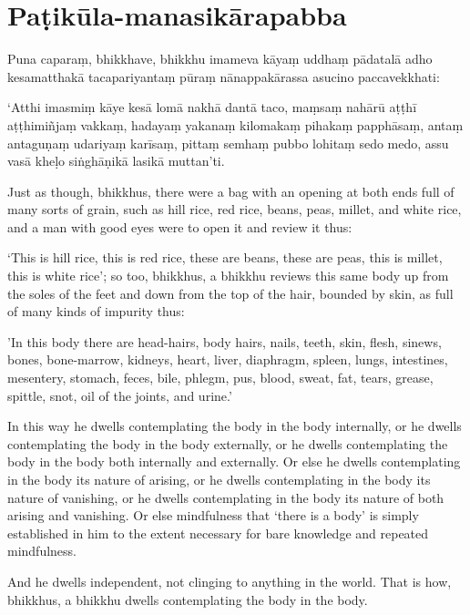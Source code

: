 
\section*{Paṭikūla-manasikārapabba}

Puna caparaṃ, bhikkhave, bhikkhu imameva kāyaṃ uddhaṃ pādatalā adho kesamatthakā
tacapariyantaṃ pūraṃ nānappakārassa asucino paccavekkhati:

‘Atthi imasmiṃ kāye kesā lomā nakhā dantā taco, maṃsaṃ nahārū aṭṭhī aṭṭhimiñjaṃ
vakkaṃ, hadayaṃ yakanaṃ kilomakaṃ pihakaṃ papphāsaṃ, antaṃ antaguṇaṃ udariyaṃ
karīsaṃ, pittaṃ semhaṃ pubbo lohitaṃ sedo medo, assu vasā kheḷo siṅghāṇikā
lasikā muttan’ti.

\englishPage

Just as though, bhikkhus, there were a bag with an opening at both ends full of
many sorts of grain, such as hill rice, red rice, beans, peas, millet, and white
rice, and a man with good eyes were to open it and review it thus:

‘This is hill rice, this is red rice, these are beans, these are peas, this is
millet, this is white rice’; so too, bhikkhus, a bhikkhu reviews this same body
up from the soles of the feet and down from the top of the hair, bounded by
skin, as full of many kinds of impurity thus:

'In this body there are head-hairs, body hairs, nails, teeth, skin, flesh,
sinews, bones, bone-marrow, kidneys, heart, liver, diaphragm, spleen, lungs,
intestines, mesentery, stomach, feces, bile, phlegm, pus, blood, sweat, fat,
tears, grease, spittle, snot, oil of the joints, and urine.'

In this way he dwells contemplating the body in the body internally, or he
dwells contemplating the body in the body externally, or he dwells contemplating
the body in the body both internally and externally. Or else he dwells
contemplating in the body its nature of arising, or he dwells contemplating in
the body its nature of vanishing, or he dwells contemplating in the body its
nature of both arising and vanishing. Or else mindfulness that ‘there is a body’
is simply established in him to the extent necessary for bare knowledge and
repeated mindfulness.

And he dwells independent, not clinging to anything in the world. That is how,
bhikkhus, a bhikkhu dwells contemplating the body in the body.


